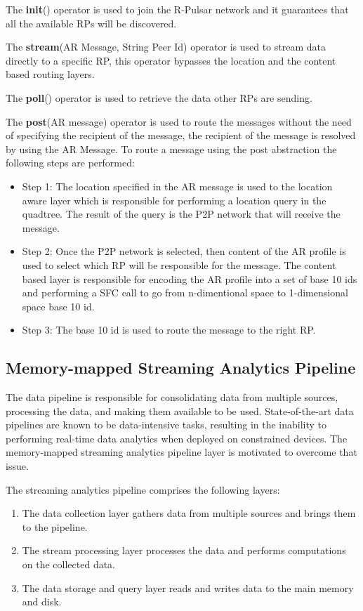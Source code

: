 The \textbf{init}() operator is used to join the R-Pulsar network and it guarantees that all the available RPs will be discovered.

The \textbf{stream}(AR Message, String Peer Id) operator is used to stream data directly to a specific RP, this operator bypasses the location and the content based routing layers.

The \textbf{poll}() operator is used to retrieve the data other RPs are sending.

The \textbf{post}(AR message) operator is used to route the messages without the need of specifying the recipient of the message, the recipient of the message is resolved by using the AR Message. To route a message using the post abstraction the following steps are performed:

\begin{itemize}
    \item Step 1: The location specified in the AR message is used to the location aware layer which is responsible for performing a location query in the quadtree. The result of the query is the P2P network that will receive the message.
    \item Step 2: Once the P2P network is selected, then content of the AR profile is used to select which RP will be responsible for the message. The content based layer is responsible for encoding the AR profile into a set of base 10 ids and performing a SFC call to go from n-dimentional space to 1-dimensional space base 10 id.
    \item Step 3: The base 10 id is used to route the message to the right RP.
\end{itemize}

\subsection{Memory-mapped Streaming Analytics Pipeline}
The data pipeline is responsible for consolidating data from multiple sources, processing the data, and making them available to be used. State-of-the-art data pipelines are known to be data-intensive tasks, resulting in the inability to performing real-time data analytics when deployed on constrained devices. The memory-mapped streaming analytics pipeline layer is motivated to overcome that issue.

The streaming analytics pipeline comprises the following layers: 

\begin{enumerate}

\item The data collection layer gathers data from multiple sources and brings them to the pipeline.
\item The stream processing layer processes the data and performs computations on the collected data.   
\item The data storage and query layer reads and writes data to the main memory and disk.

\end{enumerate}

